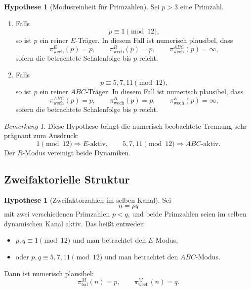 \documentclass[11pt,a4paper]{article}
\theoremstyle{definition}
\newtheorem{hypothese}[satz]{Hypothese}
\theoremstyle{remark}
\newtheorem{bemerkung}[satz]{Bemerkung}
\begin{document}
	\begin{hypothese}[Modusreinheit für Primzahlen]
		Sei \(p>3\) eine Primzahl.
		
		\begin{enumerate}
			\item Falls
			\[
			p\equiv 1\pmod{12},
			\]
			so ist \(p\) ein reiner \(E\)-Träger. In diesem Fall ist numerisch plausibel, dass
			\[
			\pi_{\mathrm{wech}}^{E}(p)=p,
			\qquad
			\pi_{\mathrm{wech}}^{R}(p)=p,
			\qquad
			\pi_{\mathrm{wech}}^{ABC}(p)=\infty,
			\]
			sofern die betrachtete Schalenfolge bis \(p\) reicht.
			
			\item Falls
			\[
			p\equiv 5,7,11\pmod{12},
			\]
			so ist \(p\) ein reiner \(ABC\)-Träger. In diesem Fall ist numerisch plausibel, dass
			\[
			\pi_{\mathrm{wech}}^{ABC}(p)=p,
			\qquad
			\pi_{\mathrm{wech}}^{R}(p)=p,
			\qquad
			\pi_{\mathrm{wech}}^{E}(p)=\infty,
			\]
			sofern die betrachtete Schalenfolge bis \(p\) reicht.
		\end{enumerate}
	\end{hypothese}
	
	\begin{bemerkung}
		Diese Hypothese bringt die numerisch beobachtete Trennung sehr prägnant zum Ausdruck:
		\[
		1\pmod{12}\Rightarrow E\text{-aktiv},
		\qquad
		5,7,11\pmod{12}\Rightarrow ABC\text{-aktiv}.
		\]
		Der \(R\)-Modus vereinigt beide Dynamiken.
	\end{bemerkung}
	
	\subsection{Zweifaktorielle Struktur}
	
	\begin{hypothese}[Zweifaktorzahlen im selben Kanal]
		Sei
		\[
		n=pq
		\]
		mit zwei verschiedenen Primzahlen \(p<q\), und beide Primzahlen seien im selben
		dynamischen Kanal aktiv. Das heißt entweder:
		\begin{itemize}
			\item \(p,q\equiv 1\pmod{12}\) und man betrachtet den \(E\)-Modus,
			\item oder \(p,q\equiv 5,7,11\pmod{12}\) und man betrachtet den \(ABC\)-Modus.
		\end{itemize}
		
		Dann ist numerisch plausibel:
		\[
		\pi_{\mathrm{bal}}^{M}(n)=p,
		\qquad
		\pi_{\mathrm{wech}}^{M}(n)=q.
		\]
	\end{hypothese}
	
\end{document}
